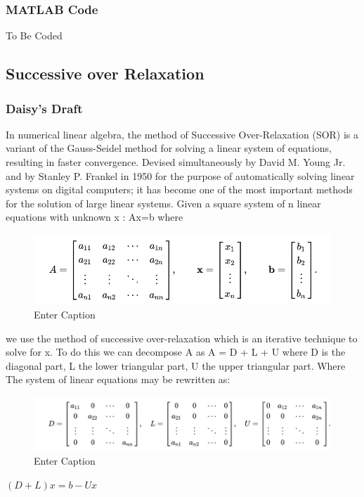 \documentclass[11pt]{article}
\begin{document}
\subsubsection{MATLAB Code}

To Be Coded

\subsection{Successive over Relaxation}

\newpage

\subsubsection{Daisy's Draft}
In numerical linear algebra, the method of Successive Over-Relaxation (SOR) is a variant of the Gauss-Seidel method for solving a linear system of equations, resulting in faster convergence. Devised simultaneously by David M. Young Jr. and by Stanley P. Frankel in 1950 for the purpose of automatically solving linear systems on digital computers; it has become one of the most important methods for the solution of large linear systems. 
Given a square system of n linear equations with unknown x : Ax=b where  
\begin{figure}[H]
    \centering
    \includegraphics[width=0.5\linewidth]{image.png}
    \caption{Enter Caption}
    \label{fig:enter-label}
\end{figure}

we use the method of successive over-relaxation which is an iterative technique to solve for x. To do this we can decompose A as A = D + L + U  where
D is the diagonal part, L the lower triangular part, U the upper triangular part. Where The system of linear equations may be rewritten as:

\begin{figure}[H]
    \centering
    \includegraphics[width=0.5\linewidth]{image2.png}
    \caption{Enter Caption}
    \label{fig:enter-label}
\end{figure}

$(D+L)x = b- Ux$
\end{document}
